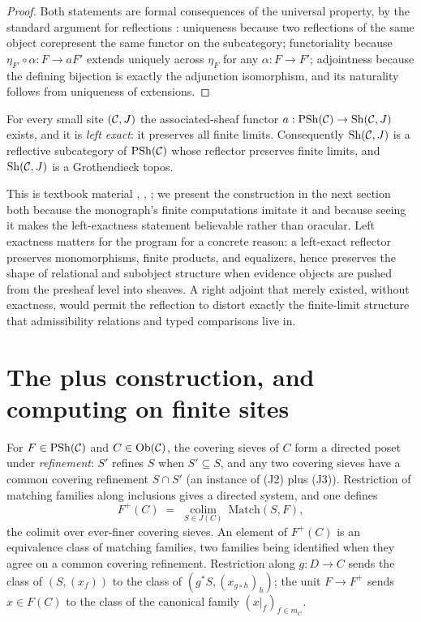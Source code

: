 \begin{proof}
Both statements are formal consequences of the universal property, by the
standard argument for reflections \cite{maclanecwm,riehl}: uniqueness because
two reflections of the same object corepresent the same functor on the
subcategory; functoriality because $\eta_{F'}\circ\alpha:F\to aF'$ extends
uniquely across $\eta_F$ for any $\alpha:F\to F'$; adjointness because the
defining bijection is exactly the adjunction isomorphism, and its naturality
follows from uniqueness of extensions.
\end{proof}

\begin{theorem}\label{ch04:thm:sheafification}
For every small site $(\mathcal{C},J)$ the associated-sheaf functor
$a:\mathrm{PSh}(\mathcal{C})\to\mathrm{Sh}(\mathcal{C},J)$ exists, and it is \emph{left exact}: it preserves
all finite limits. Consequently $\mathrm{Sh}(\mathcal{C},J)$ is a reflective subcategory of
$\mathrm{PSh}(\mathcal{C})$ whose reflector preserves finite limits, and $\mathrm{Sh}(\mathcal{C},J)$ is a
Grothendieck topos.
\end{theorem}

This is textbook material \cite[Chap.~III, \S\S5--6 and Chap.~V, \S3]{maclane},
\cite{stacks00W1}, \cite{johnstone}; we present the construction in the next
section both because the monograph's finite computations imitate it and
because seeing it makes the left-exactness statement believable rather than
oracular. Left exactness matters for the program for a concrete reason: a
left-exact reflector preserves monomorphisms, finite products, and equalizers,
hence preserves the shape of relational and subobject structure when evidence
objects are pushed from the presheaf level into sheaves. A right adjoint that
merely existed, without exactness, would permit the reflection to distort
exactly the finite-limit structure that admissibility relations and typed
comparisons live in.

\section{The plus construction, and computing on finite sites}\label{ch04:sec:plus}

\begin{construction}\label{ch04:con:plus}
For $F\in\mathrm{PSh}(\mathcal{C})$ and $C\in\mathrm{Ob}(\mathcal{C})$, the covering sieves of $C$ form a
directed poset under \emph{refinement}: $S'$ refines $S$ when $S'\subseteq S$,
and any two covering sieves have a common covering refinement
$S\cap S'$ (an instance of (J2) plus (J3)). Restriction of matching families
along inclusions gives a directed system, and one defines
\[
F^{+}(C)\;=\;\operatorname*{colim}_{S\in J(C)}\ \mathrm{Match}(S,F),
\]
the colimit over ever-finer covering sieves. An element of $F^{+}(C)$ is an
equivalence class of matching families, two families being identified when
they agree on a common covering refinement. Restriction along $g:D\to C$ sends
the class of $(S,(x_f))$ to the class of $(g^{*}S,(x_{g\circ h})_h)$; the unit
$F\to F^{+}$ sends $x\in F(C)$ to the class of the canonical family
$(x|_f)_{f\in m_C}$.
\end{construction}

